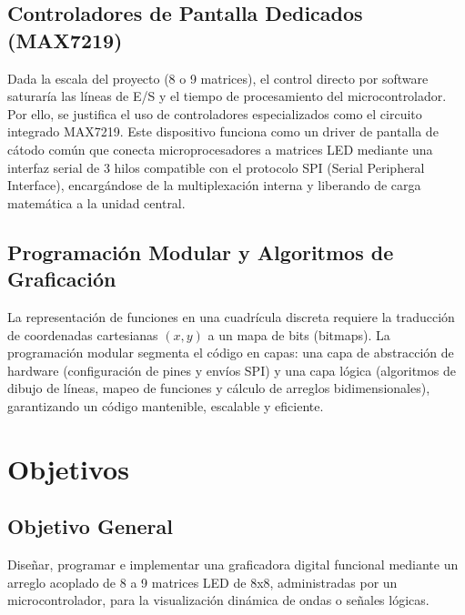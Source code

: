 \subsection{Controladores de Pantalla Dedicados (MAX7219)}
Dada la escala del proyecto (8 o 9 matrices), el control directo por software saturaría las líneas de E/S y el tiempo de procesamiento del microcontrolador. Por ello, se justifica el uso de controladores especializados como el circuito integrado MAX7219. Este dispositivo funciona como un driver de pantalla de cátodo común que conecta microprocesadores a matrices LED mediante una interfaz serial de 3 hilos compatible con el protocolo SPI (Serial Peripheral Interface), encargándose de la multiplexación interna y liberando de carga matemática a la unidad central.



\subsection{Programación Modular y Algoritmos de Graficación}
La representación de funciones en una cuadrícula discreta requiere la traducción de coordenadas cartesianas $(x, y)$ a un mapa de bits (bitmaps). La programación modular segmenta el código en capas: una capa de abstracción de hardware (configuración de pines y envíos SPI) y una capa lógica (algoritmos de dibujo de líneas, mapeo de funciones y cálculo de arreglos bidimensionales), garantizando un código mantenible, escalable y eficiente.

\section{Objetivos}

\subsection{Objetivo General}
Diseñar, programar e implementar una graficadora digital funcional mediante un arreglo acoplado de 8 a 9 matrices LED de 8x8, administradas por un microcontrolador, para la visualización dinámica de ondas o señales lógicas.


